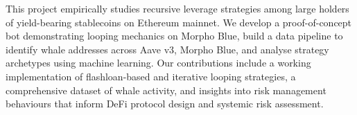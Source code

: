 This project empirically studies recursive leverage strategies among large holders of yield-bearing stablecoins on Ethereum mainnet. We develop a proof-of-concept bot demonstrating looping mechanics on Morpho Blue, build a data pipeline to identify whale addresses across Aave v3, Morpho Blue, and analyse strategy archetypes using machine learning. Our contributions include a working implementation of flashloan-based and iterative looping strategies, a comprehensive dataset of whale activity, and insights into risk management behaviours that inform DeFi protocol design and systemic risk assessment.
